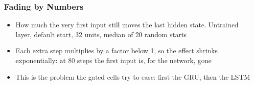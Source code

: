\begin{frame}[fragile] \frametitle{Fading by Numbers}
\begin{center}
\small
{}
\end{center}
\begin{itemize}
\item How much the very first input still moves the last hidden state. Untrained layer, default start, 32 units, median of 20 random starts
\item Each extra step multiplies by a factor below 1, so the effect shrinks exponentially: at 80 steps the first input is, for the network, gone
\item This is the problem the gated cells try to ease: first the GRU, then the LSTM
\end{itemize}
\end{frame}

